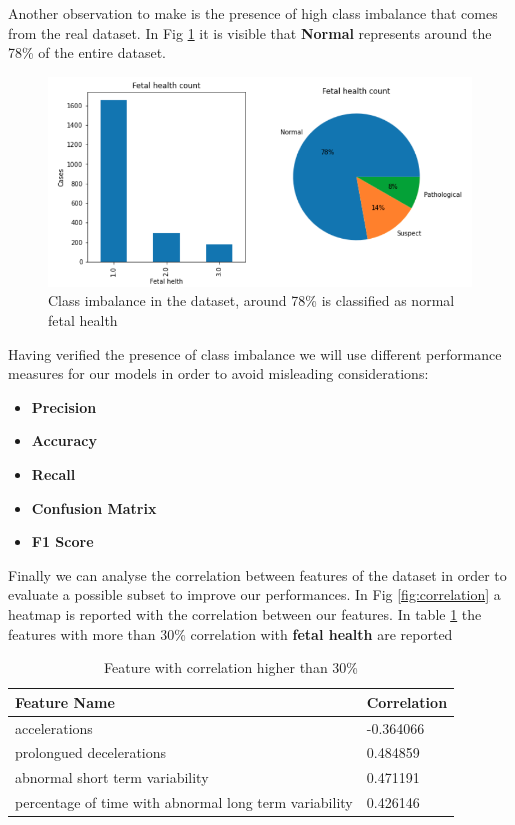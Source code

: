 \documentclass[a4paper,12pt]{article}
\begin{document}
\noindent Another observation to make is the presence of high class imbalance that comes from the real dataset. In Fig \ref{fig:imbalance} it is visible that \textbf{Normal} represents around the 78\% of the entire dataset.

\begin{figure}[H]
\begin{center}
\includegraphics[width=1.0\textwidth]{images/imbalance.png}
\end{center}
\caption{Class imbalance in the dataset, around 78\% is classified as normal fetal health}
\label{fig:imbalance}
\end{figure}

\noindent Having verified the presence of class imbalance we will use different performance measures for our models in order to avoid misleading considerations:
\bigbreak
\begin{itemize}
  \item \textbf{Precision}
  \item \textbf{Accuracy}
  \item \textbf{Recall}
  \item \textbf{Confusion Matrix}
  \item \textbf{F1 Score}
\end{itemize}

\bigbreak
\noindent Finally we can analyse the correlation between features of the dataset in order to evaluate a possible subset to improve our performances.
In Fig \ref{fig:correlation} a heatmap is reported with the correlation between our features. In table \ref{tab:correlation} the features with more than 30\% correlation with \textbf{fetal health} are reported

\begin{table}[H]
\begin{tabular}{ |p{10cm}||p{3cm}| }
  \hline
  Feature Name& Correlation \\
  \hline
  accelerations&                                            -0.364066\\
  prolongued decelerations&                                  0.484859\\
  abnormal short term variability&                           0.471191\\
  percentage of time with abnormal long term variability&    0.426146\\
  \hline
\end{tabular}
\caption{Feature with correlation higher than 30\%}
\label{tab:correlation}
\end{table}
\end{document}
